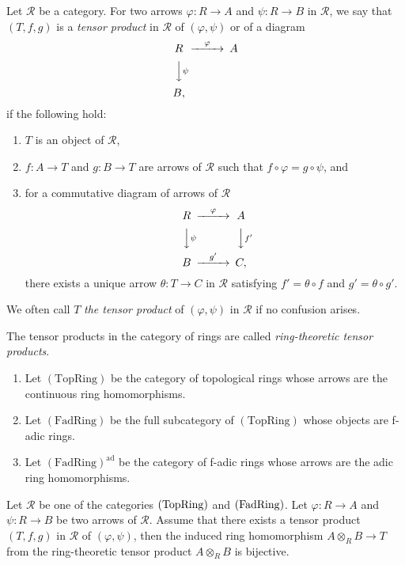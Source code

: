 \begin{dfn}\label{d-tensor}
Let $\mathcal R$ be a category. 
For two arrows $\varphi:R \to A$ and $\psi:R \to B$ in $\mathcal R$, 
we say that $(T, f, g)$ is a {\em tensor product} in $\mathcal R$ of $(\varphi, \psi)$ or of a diagram 
$$\begin{CD}
R @>\varphi >> A\\
@VV\psi V\\
B,
\end{CD}$$
if the following hold: 
\begin{enumerate}
\item 
$T$ is an object of $\mathcal R$, 
\item 
$f:A \to T$ and $g:B \to T$ are arrows of $\mathcal R$ 
such that $f \circ \varphi=g \circ \psi$, and
\item 
for a commutative diagram of arrows of $\mathcal R$ 
$$\begin{CD}
R @>\varphi >> A\\
@VV\psi V @VVf'V\\
B @>g'>>C,
\end{CD}$$
there exists a unique arrow $\theta:T \to C$ in $\mathcal R$ 
satisfying $f'=\theta \circ f$ and $g'=\theta \circ g'$. 
\end{enumerate}
We often call $T$ {\em the tensor product} of $(\varphi, \psi)$ 
in $\mathcal R$ if no confusion arises. 
\end{dfn}

\begin{dfn}\label{d-ring-tensor}
The tensor products in the category of rings are called 
{\em ring-theoretic tensor products}. 
\end{dfn}

\begin{dfn}\label{d-categories}
\begin{enumerate}
\item 
Let $(\text{TopRing})$ be the category of topological rings  
whose arrows are the continuous ring homomorphisms. 
\item 
Let $(\text{FadRing})$ be the full subcategory of $(\text{TopRing})$ 
whose objects are f-adic rings.  
\item 
Let $(\text{FadRing})^{\text{ad}}$ 
be the category of f-adic rings 
whose arrows are the adic ring homomorphisms. 
\end{enumerate}
\end{dfn}


\begin{lem}\label{l-underlying}
Let $\mathcal R$ be one of 
the categories 
$({\rm TopRing})$ and $({\rm FadRing})$. 
Let $\varphi:R \to A$ and $\psi:R \to B$ be two arrows 
of $\mathcal R$. 
Assume that there exists a tensor product $(T, f, g)$ in $\mathcal R$ 
of $(\varphi, \psi)$, 
then the induced ring homomorphism $A \otimes_R B \to T$ 
from the ring-theoretic tensor product $A \otimes_R B$ is bijective. 
\end{lem}


